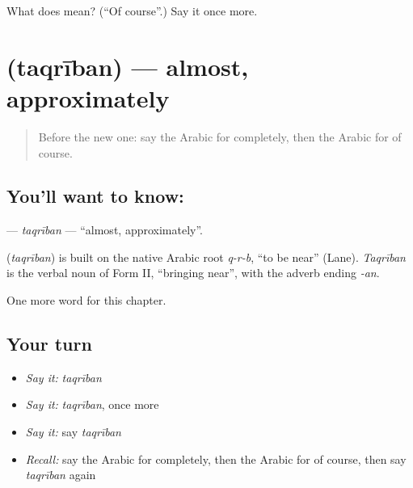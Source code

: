 \begin{tcolorbox}[breakable,colback=teal!4,colframe=teal!35!black,title={Before you move on}]
What does  mean? (\textquotedblleft{}Of course\textquotedblright{}.) Say it once more.
\end{tcolorbox}
\section[\texorpdfstring{\ar{تقريبا} (taqrīban)}{تقريبا (taqrīban)}]{ (taqrīban) — almost, approximately}

\label{lesson:AR-C238-taqriban}



\begin{quote}
Before the new one: say the Arabic for completely, then the Arabic for of course.
\end{quote}

\subsection*{You'll want to know: }
\textbf{} — \emph{taqrīban} — \textquotedblleft{}almost, approximately\textquotedblright{}.

\begin{cousinweb}
\textbf{} (\emph{taqrīban}) is built on the native Arabic root \emph{q-r-b}, \textquotedblleft{}to be near\textquotedblright{} (Lane). \emph{Taqrīban} is the verbal noun of Form II, \textquotedblleft{}bringing near\textquotedblright{}, with the adverb ending \emph{-an}.
\end{cousinweb}

\begin{grammarlens}[title={What you've built}]
One more word for this chapter.
\end{grammarlens}

\subsection*{Your turn}
\begin{itemize}
\raggedright
  \item \emph{Say it:} \emph{taqrīban}
  \item \emph{Say it:} \emph{taqrīban}, once more
  \item \emph{Say it:} say \emph{taqrīban}
  \item \emph{Recall:} say the Arabic for completely, then the Arabic for of course, then say \emph{taqrīban} again
\end{itemize}

